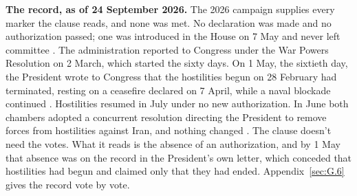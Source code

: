 \begin{esbox}
\textbf{The record, as of 24 September 2026.} The 2026 campaign supplies every marker the clause reads, and none was met. No declaration was made and no authorization passed; one was introduced in the House on 7 May and never left committee \autocite{hjres176}. The administration reported to Congress under the War Powers Resolution on 2 March, which started the sixty days. On 1 May, the sixtieth day, the President wrote to Congress that the hostilities begun on 28 February had terminated, resting on a ceasefire declared on 7 April, while a naval blockade continued \autocite{cbs2026terminated,lawfare2026sixtydays}. Hostilities resumed in July under no new authorization. In June both chambers adopted a concurrent resolution directing the President to remove forces from hostilities against Iran, and nothing changed \autocite{hconres86,asil2026iranwpr}. The clause doesn't need the votes. What it reads is the absence of an authorization, and by 1 May that absence was on the record in the President's own letter, which conceded that hostilities had begun and claimed only that they had ended. Appendix~\ref{sec:G.6} gives the record vote by vote.
\end{esbox}
